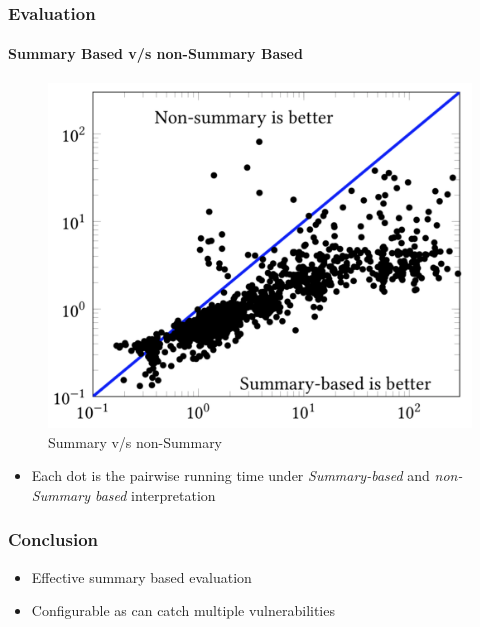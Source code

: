 \documentclass{beamer}
\begin{document}
\begin{frame}[fragile]
  \frametitle{Evaluation}
  \framesubtitle{Summary Based v/s non-Summary Based}
  \begin{figure}
    \centering
    \includegraphics[scale=0.25]{evaluationSummary}
    \caption{Summary v/s non-Summary}
  \end{figure}
  \begin{itemize}
    \item Each dot is the pairwise running time under
      \textit{Summary-based} and \textit{non-Summary based}
      interpretation
  \end{itemize}
\end{frame}

\begin{frame}
  \frametitle{Conclusion}
  \begin{itemize}
    \item Effective summary based evaluation
    \item Configurable as can catch multiple vulnerabilities
  \end{itemize}
\end{frame}
\end{document}
